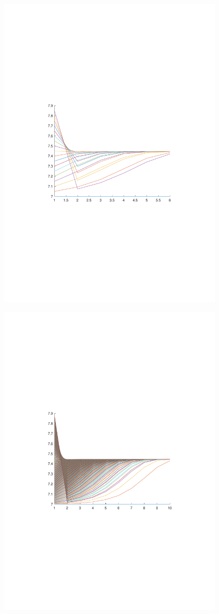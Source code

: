 \begin{figure}[H]
\centering
\includegraphics[width=11cm]{fig/2_1.pdf}
\end{figure}

\begin{figure}[H]
\centering
\includegraphics[width=11cm]{fig/2_2.pdf}
\end{figure}

